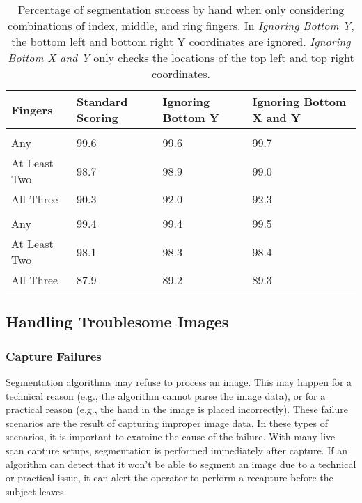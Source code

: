 \documentclass[]{article}
\begin{document}
\begin{table}[!h]

\caption{\label{tab:twoinch-per-hand-index-middle-ring}Percentage of segmentation success by hand when only considering combinations of index, middle, and ring fingers. In \textit{Ignoring Bottom Y}, the bottom left and bottom right Y coordinates are ignored. \textit{Ignoring Bottom X and Y} only checks the locations of the top left and top right coordinates.}
\centering
\begin{tabular}{llll}
\toprule
Fingers & Standard Scoring & Ignoring Bottom Y & Ignoring Bottom X and Y\\
\midrule
\addlinespace[0.3em]
\multicolumn{4}{l}{\textbf{Right}}\\
\rowcolor{gray!6}  \hspace{1em}Any & 99.6 & 99.6 & 99.7\\
\hspace{1em}At Least Two & 98.7 & 98.9 & 99.0\\
\rowcolor{gray!6}  \hspace{1em}All Three & 90.3 & 92.0 & 92.3\\
\addlinespace[0.3em]
\multicolumn{4}{l}{\textbf{Left}}\\
\hspace{1em}Any & 99.4 & 99.4 & 99.5\\
\rowcolor{gray!6}  \hspace{1em}At Least Two & 98.1 & 98.3 & 98.4\\
\hspace{1em}All Three & 87.9 & 89.2 & 89.3\\
\bottomrule
\end{tabular}
\end{table}

\clearpage

\subsection{Handling Troublesome Images}\label{sec-twoinch-troublesome}

\subsubsection{Capture
Failures}\label{twoinch-troublesome-capture-failures}

Segmentation algorithms may refuse to process an image. This may happen
for a technical reason (e.g., the algorithm cannot parse the image
data), or for a practical reason (e.g., the hand in the image is placed
incorrectly). These failure scenarios are the result of capturing
improper image data. In these types of scenarios, it is important to
examine the cause of the failure. With many live scan capture setups,
segmentation is performed immediately after capture. If an algorithm can
detect that it won't be able to segment an image due to a technical or
practical issue, it can alert the operator to perform a recapture before
the subject leaves.
\end{document}

